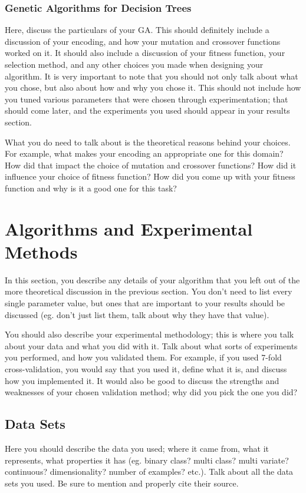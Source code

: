 \documentclass[12pt, letterpaper]{article}
\begin{document}
\subsubsection*{Genetic Algorithms for Decision Trees}
Here, discuss the particulars of your GA.  This should definitely include a
discussion of your encoding, and how your mutation and crossover functions
worked on it.  It should also include a discussion of your fitness function,
your selection method, and any other choices you made when designing your
algorithm.  It is very important to note that you should not only talk about
what you chose, but also about how and why you chose it.  This should not
include how you tuned various parameters that were chosen through
experimentation; that should come later, and the experiments you used should
appear in your results section.

What you do need to talk about is the theoretical reasons behind your choices.
For example, what makes your encoding an appropriate one for this domain?  How
did that impact the choice of mutation and crossover functions?  How did it
influence your choice of fitness function?  How did you come up with your
fitness function and why is it a good one for this task? 

\section{Algorithms and Experimental Methods}

In this section, you describe any details of your algorithm that you left out of
the more theoretical discussion in the previous section.  You don't need to list
every single parameter value, but ones that are important to your results should
be discussed (eg. don't just list them, talk about why they have that value).

You should also describe your experimental methodology; this is where you talk
about your data and what you did with it.  Talk about what sorts of experiments
you performed, and how you validated them.  For example, if you used 7-fold
cross-validation, you would say that you used it, define what it is, and discuss
how you implemented it.  It would also be good to discuss the strengths and
weaknesses of your chosen validation method; why did you pick the one you did?

\subsection*{Data Sets}
Here you should describe the data you used; where it came from, what it
represents, what properties it has (eg. binary class? multi class? multi
variate? continuous? dimensionality? number of examples? etc.).  Talk about all
the data sets you used.  Be sure to mention and properly cite their source.
\end{document}
